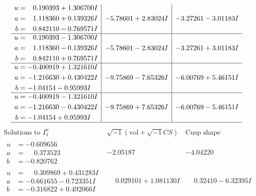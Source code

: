 \documentclass[1p]{elsarticle_modified}
\theoremstyle{definition}
\newcommand{\I}{\sqrt{-1}}
\begin{document}
$$\begin{array}{c|c|c}
\begin{aligned}
u &= \phantom{-}0.190393 + 1.306700 I \\
a &= \phantom{-}1.118360 + 0.139326 I \\
b &= \phantom{-}0.842110 - 0.769571 I\end{aligned}
 & -5.78601 + 2.83024 I & -3.27261 - 3.01183 I \\ \hline\begin{aligned}
u &= \phantom{-}0.190393 - 1.306700 I \\
a &= \phantom{-}1.118360 - 0.139326 I \\
b &= \phantom{-}0.842110 + 0.769571 I\end{aligned}
 & -5.78601 - 2.83024 I & -3.27261 + 3.01183 I \\ \hline\begin{aligned}
u &= -0.400919 + 1.321610 I \\
a &= -1.216630 + 0.430422 I \\
b &= -1.04154 - 0.95993 I\end{aligned}
 & -9.75869 - 7.65326 I & -6.00769 + 5.46151 I \\ \hline\begin{aligned}
u &= -0.400919 - 1.321610 I \\
a &= -1.216630 - 0.430422 I \\
b &= -1.04154 + 0.95993 I\end{aligned}
 & -9.75869 + 7.65326 I & -6.00769 - 5.46151 I\\
 \hline 
 \end{array}$$\newpage$$\begin{array}{c|c|c}  
\text{Solutions to }I^u_{1}& \I (\text{vol} + \sqrt{-1}CS) & \text{Cusp shape}\\
 \hline 
\begin{aligned}
u &= -0.609656\phantom{ +0.000000I} \\
a &= \phantom{-}0.373523\phantom{ +0.000000I} \\
b &= -0.820762\phantom{ +0.000000I}\end{aligned}
 & -2.05187\phantom{ +0.000000I} & -4.04220\phantom{ +0.000000I} \\ \hline\begin{aligned}
u &= \phantom{-}0.309869 + 0.431283 I \\
a &= -0.661655 - 0.723351 I \\
b &= -0.316822 + 0.492066 I\end{aligned}
 & \phantom{-}0.029101 + 1.081130 I & \phantom{-}0.32410 - 6.32395 I \\ \hline\begin{aligned}

\end{aligned}
\end{array}$$
\end{document}
